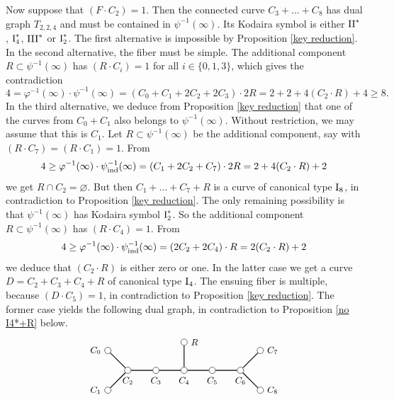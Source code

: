 \documentclass[oneside, 12pt]{amsart}
\theoremstyle{definition}
\theoremstyle{remark}
\newcommand{\I}{\text{\rm I}}
\newcommand{\II}{\text{\rm II}}
\newcommand{\III}{\text{\rm III}}
\newcommand{\ind}{\text{\rm ind}}
\begin{document}
Now suppose that $(F\cdot C_2)=1$. Then the connected curve $C_3+\ldots + C_8$ has dual graph $T_{2,2,4}$ 
and must be contained in $\psi^{-1}(\infty)$. Its Kodaira symbol is either $\II^*$, $\I_4^*$, $\III^*$ or $\I_2^*$.
The first alternative  is impossible by Proposition \ref{key reduction}. 
In the second alternative, the fiber must be simple.
The additional component $R\subset\psi^{-1}(\infty)$ has $(R\cdot C_i)=1$ for all $i\in\{0,1,3\}$,
which gives the contradiction
$$
4=\varphi^{-1}(\infty)\cdot\psi^{-1}(\infty) = (C_0+C_1+2C_2+2C_3)\cdot 2R= 2+2+4(C_2\cdot R) + 4\geq 8.
$$
In the third  alternative, we deduce
from Proposition \ref{key reduction} that one of the curves from $C_0+C_1$ also belongs to $\psi^{-1}(\infty)$.
Without restriction, we may assume that this is $C_1$. Let $R\subset\psi^{-1}(\infty)$ be the additional component,
say with  $(R\cdot C_7)=(R\cdot C_1)=1$. From
$$
4\geq \varphi^{-1}(\infty)\cdot\psi^{-1}_\ind(\infty) = (C_1+2C_2+C_7)\cdot 2R = 2+ 4(C_2\cdot R) + 2
$$
we get $R\cap  C_2=\varnothing$. But then $C_1+\ldots+C_7+R$ is a curve of canonical type $\I_8$, in contradiction
to Proposition \ref{key reduction}.
The only remaining possibility is that  $\psi^{-1}(\infty) $ has Kodaira symbol $\I_2^*$.
So the additional component $R\subset\psi^{-1}(\infty)$ has $(R\cdot C_4)=1$. From
$$
4\geq \varphi^{-1}(\infty)\cdot\psi^{-1}_\ind(\infty) = (2C_2+2C_4)\cdot R=   2(C_2\cdot R) + 2
$$
we deduce that $(C_2\cdot R)$ is either zero or one.
In the latter case we get a curve $D=C_2+C_3+C_4+R$ of canonical type $\I_4$.
The ensuing fiber is multiple, because $(D\cdot C_5)=1$, in contradiction to Proposition \ref{key reduction}.
The former case yields the following dual graph, in contradiction to  Proposition \ref{no I4*+R} below.
\begin{equation*}
\begin{gathered}
\begin{tikzpicture}
[node distance=1cm, font=\small]

\tikzstyle{vertex}=[circle, draw, fill=white, inner sep=0mm, minimum size=1.5ex]
\node[vertex]	(C2)  	at (1,0) 	[label=below:{$C_2$}] 		{};
\node[vertex]	(C3)			[right of=C2, label=below:{$C_3$}]	{};
\node[vertex]	(C4)			[right of=C3, label=below:{$C_4$}]	{};
\node[vertex]	(C5)			[right of=C4, label=below:{$C_5$}]	{};
\node[vertex]	(C6)			[right of=C5, label=below:{$C_6$}]	{};

\node[vertex]	(C7)			[above right of=C6, label=right:{$C_7$}]	{};
\node[vertex]	(C8)			[below right of=C6, label=right:{$C_8$}]	{};
\node[vertex]	(C0)			[above left  of=C2, label=left :{$C_0$}]	{};
\node[vertex]	(C1)			[below left  of=C2, label=left :{$C_1$}]	{};
\node[vertex]	(R)			[above of=C4, label=right :{$R$}]	{};

\draw [thick] (C2)--(C3)--(C4)--(C5)--(C6);
\draw [thick] (C0)--(C2)--(C1);
\draw [thick] (C7)--(C6)--(C8);
\draw [thick] (C4)--(R);
\end{tikzpicture}
\end{gathered}
\end{equation*}
\end{document}
